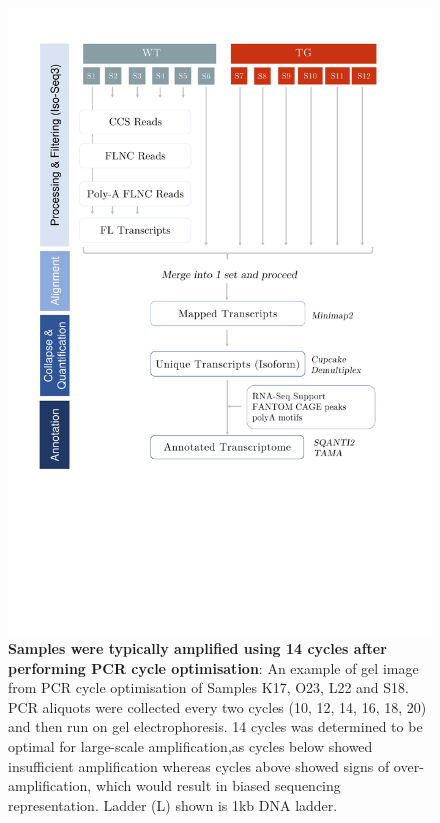 \begin{figure}[!htp]
	\centering
	\includegraphics[page=2,trim={0 35cm 0 5cm},clip,scale = 0.45]{Figures/Pipeline.pdf}
	\captionsetup{width=0.95\textwidth}
	\caption[Iso-Seq Whole Transcriptome - PCR cycle optimisation]%
	{\textbf{Samples were typically amplified using 14 cycles after performing PCR cycle optimisation}: An example of gel image from PCR cycle optimisation of Samples K17, O23, L22 and S18. PCR aliquots were collected every two cycles (10, 12, 14, 16, 18, 20) and then run on gel electrophoresis. 14 cycles was determined to be optimal for large-scale amplification,as cycles below showed insufficient amplification whereas cycles above showed signs of over-amplification, which would result in biased sequencing representation. Ladder (L) shown is 1kb DNA ladder.}
	\label{fig:isoseq_whole_pccresults}
\end{figure}



